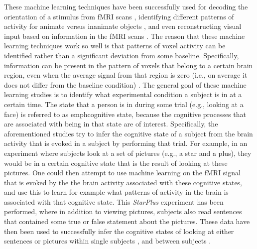 \documentclass[preprint,journal,11pt]{vgtc}
\begin{document}
These machine learning techniques have been successfully used for decoding the orientation of a stimulus from fMRI scans \cite{ka:2005decoding}, identifying different patterns of activity for animate versus inanimate objects \cite{kr:2008RSA}, and even reconstructing visual input based on information in the fMRI scans \cite{mi:2008re}. The reason that these machine learning techniques work so well is that patterns of voxel activity can be identified rather than a significant deviation from some baseline. Specifically, information can be present in the pattern of voxels that belong to a certain brain region, even when the average signal from that region is zero (i.e., on average it does not differ from the baseline condition) \cite{to:2012rev}.
The general goal of these machine learning studies is to identify what experimental condition a subject is in at a certain time. The state that a person is in during some trial (e.g., looking at a face) is referred to as emph{cognitive state}, because the cognitive processes that are associated with being in that state are of interest. Specifically, the aforementioned studies try to infer the cognitive state of a subject from the brain activity that is evoked in a subject by performing that trial. For example, in an experiment where subjects look at a set of pictures (e.g., a star and a plus), they would be in a certain cognitive state that is the result of looking at these pictures. One could then attempt to use machine learning on the fMRI signal that is evoked by the the brain activity associated with these cognitive states, and use this to learn for example what patterns of activity in the brain is associated with that cognitive state. This \emph{StarPlus} experiment has been performed, where in addition to viewing pictures, subjects also read sentences that contained some true or false statement about the pictures. These data have then been used to successfully infer the cognitive states of looking at either sentences or pictures within single subjects \cite{mi:2003within}, and between subjects \cite{wa:2003betw}.
\end{document}
